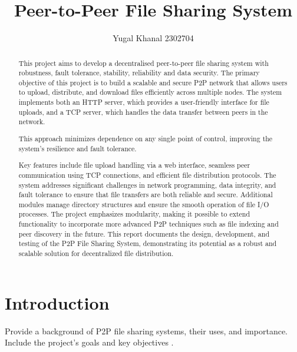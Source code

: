 \documentclass[12pt,a4paper]{report}
\title{Peer-to-Peer File Sharing System}
\author{Yugal Khanal 2302704}
\date{}
\begin{document}
\maketitle

\begin{abstract}
  This project aims to develop a decentralised peer-to-peer file sharing system with robustness, fault tolerance, stability, reliability and data security. The primary objective of this project is to build a scalable and secure P2P network that allows users to upload, distribute, and download files efficiently across multiple nodes. The system implements both an HTTP server, which provides a user-friendly interface for file uploads, and a TCP server, which handles the data transfer between peers in the network.

  This approach minimizes dependence on any single point of control, improving the system’s resilience and fault tolerance.

  \vspace{3.5mm}Key features include file upload handling via a web interface, seamless peer communication using TCP connections, and efficient file distribution protocols. The system addresses significant challenges in network programming, data integrity, and fault tolerance to ensure that file transfers are both reliable and secure. Additional modules manage directory structures and ensure the smooth operation of file I/O processes. The project emphasizes modularity, making it possible to extend functionality to incorporate more advanced P2P techniques such as file indexing and peer discovery in the future. This report documents the design, development, and testing of the P2P File Sharing System, demonstrating its potential as a robust and scalable solution for decentralized file distribution.
\end{abstract}

\tableofcontents
\newpage

\chapter{Introduction}
    Provide a background of P2P file sharing systems, their uses, and importance. Include the project’s goals and key objectives .
\end{document}
